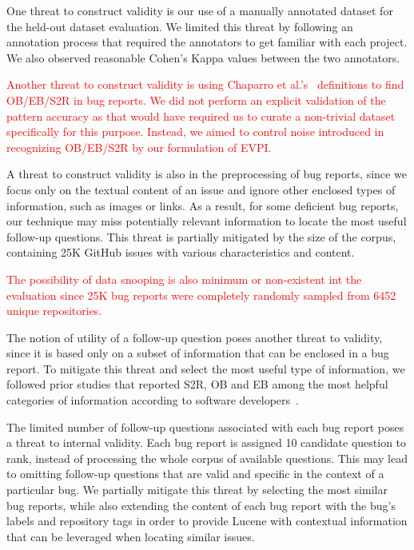 One threat to construct validity is our use of a manually annotated dataset for the held-out dataset evaluation. We limited this threat by following an annotation process that required the annotators to get familiar with each project. We also observed reasonable Cohen's Kappa values between the two annotators.

\textcolor{red}{Another threat to construct validity is using Chaparro et al.'s~\cite{chaparro17detecting} definitions to find OB/EB/S2R in bug reports. We did not perform an explicit validation of the pattern accuracy as that would have required us to curate a non-trivial dataset specifically for this purpose. Instead, we aimed to control noise introduced in recognizing OB/EB/S2R by our formulation of EVPI.}

A threat to construct validity is also in the preprocessing of bug reports, since we focus only on the textual content of an issue and ignore other enclosed types of information, such as images or links. As a result, for some deficient bug reports, our technique may miss potentially relevant information to locate the most useful follow-up questions. This threat is partially mitigated by the size of the corpus, containing 25K GitHub issues with various characteristics and content.

\textcolor{red}{The possibility of data snooping is also minimum or non-existent int the evaluation since 25K bug reports were completely randomly sampled from 6452 unique repositories.}

The notion of utility of a follow-up question poses another threat to validity, since it is based only on a subset of information that can be enclosed in a bug report. To mitigate this threat and select the most useful type of information, we followed prior studies that reported S2R, OB and EB among the most helpful categories of information according to software developers~\cite{Zimmermann2010}.



The limited number of follow-up questions associated with each bug report poses a threat to internal validity. Each bug report is assigned 10 candidate question to rank, instead of processing the whole corpus of available questions. This  may lead to omitting follow-up questions that are valid and specific in the context of a particular bug. We partially mitigate this threat by selecting the most similar bug reports, while also extending the content of each bug report with the bug's labels and repository tags in order to provide Lucene with contextual information that can be leveraged when locating similar issues.


